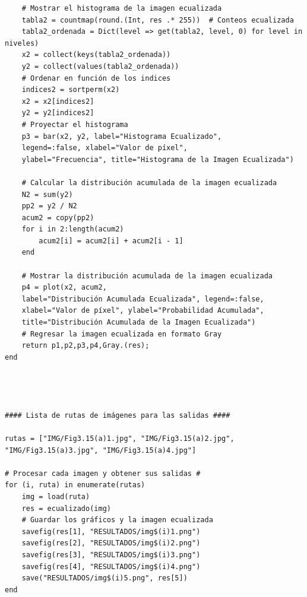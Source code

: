 \documentclass[11pt, letterpaper]{article}
\begin{document}
\begin{verbatim}
	# Mostrar el histograma de la imagen ecualizada
	tabla2 = countmap(round.(Int, res .* 255))  # Conteos ecualizada
	tabla2_ordenada = Dict(level => get(tabla2, level, 0) for level in niveles)
	x2 = collect(keys(tabla2_ordenada))
	y2 = collect(values(tabla2_ordenada))
	# Ordenar en función de los indices
	indices2 = sortperm(x2)
	x2 = x2[indices2]
	y2 = y2[indices2]
	# Proyectar el histograma
	p3 = bar(x2, y2, label="Histograma Ecualizado",
	legend=:false, xlabel="Valor de píxel", 
	ylabel="Frecuencia", title="Histograma de la Imagen Ecualizada")
	
	# Calcular la distribución acumulada de la imagen ecualizada
	N2 = sum(y2)
	pp2 = y2 / N2
	acum2 = copy(pp2)
	for i in 2:length(acum2)
		acum2[i] = acum2[i] + acum2[i - 1]
	end
	
	# Mostrar la distribución acumulada de la imagen ecualizada
	p4 = plot(x2, acum2, 
	label="Distribución Acumulada Ecualizada", legend=:false,
	xlabel="Valor de píxel", ylabel="Probabilidad Acumulada",
	title="Distribución Acumulada de la Imagen Ecualizada")
	# Regresar la imagen ecualizada en formato Gray
	return p1,p2,p3,p4,Gray.(res);
end




#### Lista de rutas de imágenes para las salidas ####

rutas = ["IMG/Fig3.15(a)1.jpg", "IMG/Fig3.15(a)2.jpg",
"IMG/Fig3.15(a)3.jpg", "IMG/Fig3.15(a)4.jpg"]

# Procesar cada imagen y obtener sus salidas #
for (i, ruta) in enumerate(rutas)
	img = load(ruta)
	res = ecualizado(img)
	# Guardar los gráficos y la imagen ecualizada
	savefig(res[1], "RESULTADOS/img$(i)1.png")
	savefig(res[2], "RESULTADOS/img$(i)2.png")
	savefig(res[3], "RESULTADOS/img$(i)3.png")
	savefig(res[4], "RESULTADOS/img$(i)4.png")
	save("RESULTADOS/img$(i)5.png", res[5])
end
\end{verbatim}

	
	
	
	
	
	
	
\end{document}
